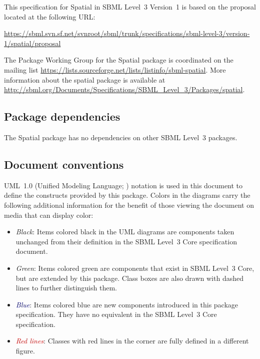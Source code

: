 This specification for Spatial in SBML Level~3 Version~1 is based on the proposal located at the following URL:

\begin{center}
  \vspace*{1ex}\small
  \url{https://sbml.svn.sf.net/svnroot/sbml/trunk/specifications/sbml-level-3/version-1/spatial/proposal}
  \vspace*{1ex}
\end{center}

The Package Working Group for the Spatial package is coordinated on the mailing list \url{https://lists.sourceforge.net/lists/listinfo/sbml-spatial}.  More information about the spatial package is available at \url{http://sbml.org/Documents/Specifications/SBML_Level_3/Packages/spatial}.

\subsection{Package dependencies}

The Spatial package has no dependencies on other SBML Level~3 packages.


\subsection{Document conventions}
\label{conventions}

UML~1.0 (Unified Modeling Language; \citealt{eriksson:1998, oestereich:1999}) notation is used in this document to define the constructs provided by this package.  Colors in the diagrams carry the following additional information for the benefit of those viewing the document on media that can display color:

\begin{itemize}

\item[\raisebox{2.75pt}{\colorbox{black}{\rule{0.8pt}{0.8pt}}}]
  \emph{Black}: Items colored black in the UML diagrams are components
  taken unchanged from their definition in the SBML Level~3 Core
  specification document.

\item[\raisebox{2.75pt}{\colorbox{mediumgreen}{\rule{0.8pt}{0.8pt}}}]
  \emph{\textcolor{mediumgreen}{Green}}: Items colored green are
  components that exist in SBML Level~3 Core, but are extended by this
  package.  Class boxes are also drawn with dashed lines to further
  distinguish them.

\item[\raisebox{2.75pt}{\colorbox{darkblue}{\rule{0.8pt}{0.8pt}}}]
  \emph{\textcolor{darkblue}{Blue}}: Items colored blue are new
  components introduced in this package specification.  They have no
  equivalent in the SBML Level~3 Core specification.

\item[\raisebox{2.75pt}{\colorbox{red}{\rule{0.8pt}{0.8pt}}}]
  \emph{\textcolor{red}{Red lines}}: Classes with red lines in the corner are fully defined in a different figure.

\end{itemize}

